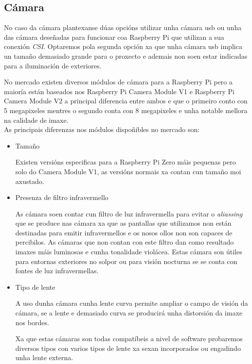 \subsection{Cámara}

No caso da cámara plantexanse dúas opcións utilizar unha cámara usb ou unha das cámara deseñadas para funcionar coa Raspberry Pi que utilizan a sua conexión \emph{CSI}. Optaremos pola segunda opción xa que unha cámara usb implica un tamaño demasiado grande para o proxecto e ademais non soen estar indicadas para a iluminación de exteriores.

No mercado existen diversos módulos de cámara para a Raspberry Pi pero a maioría están baseados nos Raspberry Pi Camera Module V1 e Raspberry Pi Camera Module V2 a principal diferencia entre ambos e que o primeiro conto con 5 megapixeles mentres o segundo conta con 8 megapixeles e unha notable mellora na calidade de imaxe.\\

As principais diferenzas nos módulos dispoñibles no mercado son:
\begin{itemize}
    \item Tamaño

Existen versións especificas para a Raspberry Pi Zero máis pequenas pero solo do Camera Module V1, as versións normais xa contan cun tamaño moi axustado.

    \item Presenza de filtro infravermello

As cámara soen contar cun filtro de luz infravermella para evitar o \emph{aliassing} que se produce nas cámara xa que as pantallas que utilizamos non están destinadas para emitir infravermellos e os nosos ollos non son capaces de percibilos. As cámaras que non contan con este filtro dan como resultado imaxes máis luminosas e cunha tonalidade violácea. Estas cámara son útiles para entornas exteriores no solpor ou para visión nocturna se se conta con fontes de luz infravermellas.

    \item Tipo de lente

A uso dunha cámara cunha lente curva permite ampliar o campo de visión da cámara, se a lente e demasiado curva se producirá unha distorsión da imaxe nos bordes.

Xa que estas cámaras son todas compatíbeis a nivel de software probaremos diversos tipos con varios tipos de lente xa sexan incorporados ou engadindo unha lente externa.
\end{itemize}




